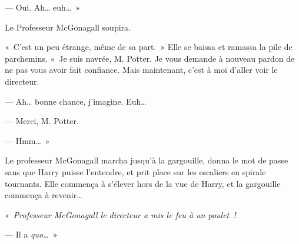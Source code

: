 --- Oui. Ah… euh…~»

Le Professeur McGonagall soupira.

«~C'est un peu étrange, même de sa part.~» Elle se baissa et ramassa la pile de parchemins. «~Je suis navrée, M. Potter. Je vous demande à nouveau pardon de ne pas vous avoir fait confiance. Mais maintenant, c'est à moi d'aller voir le directeur.

--- Ah… bonne chance, j'imagine. Euh…

--- Merci, M. Potter.

--- Hmm…~»

Le professeur McGonagall marcha jusqu'à la gargouille, donna le mot de passe sans que Harry puisse l'entendre, et prit place sur les escaliers en spirale tournants. Elle commença à s'élever hors de la vue de Harry, et la gargouille commença à revenir…

«~\emph{Professeur McGonagall le directeur a mis le feu à un poulet~!}

--- Il a \emph{quo…}~»
